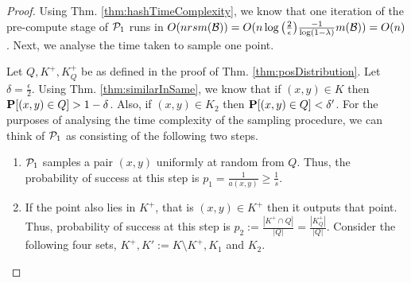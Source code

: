 \posRuntimeLSH*
\begin{proof}
Using Thm. \ref{thm:hashTimeComplexity}, we know that one iteration of the pre-compute stage of $\mathcal P_1$ runs in $O(n r s m(\mathcal B)) = O(n\log \big(\frac{2}{\epsilon}\big)\frac{-1}{\log(1-\lambda)} m(\mathcal B)) = O(n)$. Next, we analyse the time taken to sample one point.  

Let $Q, K^+, K_Q^+$ be as defined in the proof of Thm. \ref{thm:posDistribution}. Let $\delta = \frac{\epsilon}{2}$. Using Thm. \ref{thm:similarInSame}, we know that if $(x, y) \in K$ then $\mathbf P[(x, y) \in Q] > 1-\delta$. Also, if $(x, y) \in K_2$ then $\mathbf P[(x, y) \in Q] < \delta'$. For the purposes of analysing the time complexity of the sampling procedure, we can think of $\mathcal P_1$ as consisting of the following two steps. 
\begin{enumerate}[label=\textbf{T.\arabic*}]
  \item $\mathcal P_1$ samples a pair $(x, y)$ uniformly at random from $Q$. Thus, the probability of success at this step is $p_1 = \frac{1}{a(x, y)} \ge \frac{1}{s}$. 
  \item If the point also lies in $K^+$, that is $(x, y) \in K^+$ then it outputs that point. Thus, probability of success at this step is $p_2 := \frac{|K^+ \cap Q|}{|Q|} = \frac{|K^+_Q|}{|Q|}$. Consider the following four sets, $K^+, K' := K\setminus K^+, K_1$ and $K_2$. 


\end{enumerate}
\end{proof}
